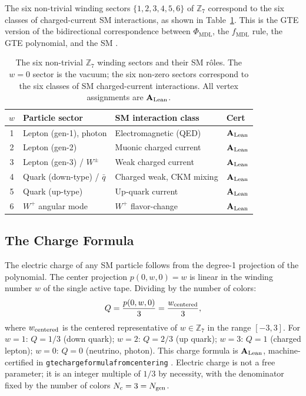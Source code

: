 \documentclass[11pt,openany]{book}
\theoremstyle{remark}
\newcommand{\GTE}{\text{GTE}}
\newcommand{\MDL}{\text{MDL}}
\newcommand{\ZS}{\mathbb{Z}_7}
\newcommand{\lean}[1]{%
  \penalty-100
  \begingroup\def\_{\textunderscore\allowbreak}\texttt{#1}\endgroup}
\newcommand{\Ngen}{N_{\rm gen}}
\newcommand{\Nc}{N_c}
\newcommand{\CatAL}{\ensuremath{\textbf{A}_{\rm Lean}}}
\begin{document}
The six non-trivial winding sectors $\{1, 2, 3, 4, 5, 6\}$ of $\ZS$ correspond to the
six classes of charged-current SM interactions, as shown in
Table~\ref{tab:six_arrows_forces}.  This is the GTE version of the bidirectional
correspondence between $\Phi_{\MDL}$, the $f_{\MDL}$ rule, the GTE polynomial, and the
SM \cite{SpivackGTEUnification}.

\begin{table}[htbp]
\centering
\caption{The six non-trivial $\ZS$ winding sectors and their SM rôles.
The $w=0$ sector is the vacuum; the six non-zero sectors correspond to the
six classes of SM charged-current interactions.  All vertex assignments are \CatAL.}
\label{tab:six_arrows_forces}
\renewcommand{\arraystretch}{1.25}
\begin{tabular}{clll}
\toprule
$w$ & Particle sector & SM interaction class & Cert \\
\midrule
1 & Lepton (gen-1), photon & Electromagnetic (QED) & \CatAL \\
2 & Lepton (gen-2) & Muonic charged current & \CatAL \\
3 & Lepton (gen-3) / $W^\pm$ & Weak charged current & \CatAL \\
4 & Quark (down-type) / $\bar{q}$ & Charged weak, CKM mixing & \CatAL \\
5 & Quark (up-type) & Up-quark current & \CatAL \\
6 & $W^+$ angular mode & $W^+$ flavor-change & \CatAL \\
\bottomrule
\end{tabular}
\end{table}

\subsection*{The Charge Formula}

The electric charge of any SM particle follows from the degree-1 projection of the
\GTE{} polynomial.  The center projection $p(0, w, 0) = w$ is linear in the winding number
$w$ of the single active tape.  Dividing by the number of colors:
\begin{equation}
  Q = \frac{p(0, w, 0)}{3} = \frac{w_{\rm centered}}{3},
  \label{eq:charge_formula_forces}
\end{equation}
where $w_{\rm centered}$ is the centered representative of $w \in \ZS$ in the range
$[-3, 3]$.  For $w = 1$: $Q = 1/3$ (down quark); $w = 2$: $Q = 2/3$ (up quark); $w = 3$:
$Q = 1$ (charged lepton); $w = 0$: $Q = 0$ (neutrino, photon).
This charge formula is \CatAL, machine-certified in
\lean{gte\_charge\_formula\_from\_centering}
\cite{SpivackGTEPolynomialUFT}.  Electric charge is not a free parameter; it is an integer
multiple of $1/3$ by necessity, with the denominator fixed by the number of colors $\Nc
= 3 = \Ngen$.
\end{document}
